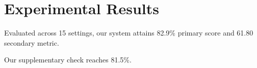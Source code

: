\section{Experimental Results}\label{sec:results}

Evaluated across 15 settings, our system attains 82.9\% primary score and 61.80 secondary metric.

Our supplementary check reaches 81.5\%.
